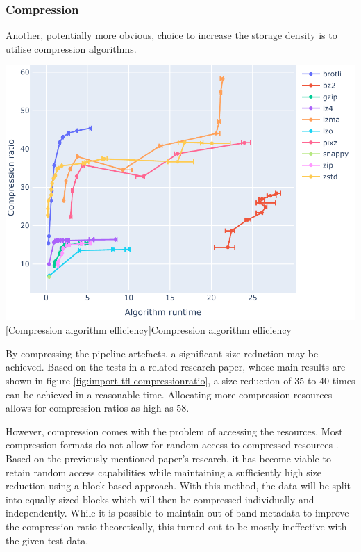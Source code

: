         \subsubsection{Compression}
            Another, potentially more obvious, choice to increase the storage density is to utilise compression algorithms.
            
            \begin{Figure}
                \includegraphics[width=\linewidth]{image/imported/lineplot-runtime-compressionratio}
                [Compression algorithm efficiency]{Compression algorithm efficiency \cite{tfl}}
                \label{fig:import-tfl-compressionratio}
            \end{Figure}
            
            By compressing the pipeline artefacts, a significant size reduction may be achieved. Based on the tests in a related research paper, whose main results are shown in figure \ref{fig:import-tfl-compressionratio}, a size reduction of 35 to 40 times can be achieved in a reasonable time. Allocating more compression resources allows for compression ratios as high as 58. \cite{tfl}
            
            However, compression comes with the problem of accessing the resources. Most compression formats do not allow for random access to compressed resources \cite{random-access-compression}. Based on the previously mentioned paper's research, it has become viable to retain random access capabilities while maintaining a sufficiently high size reduction using a block-based approach. With this method, the data will be split into equally sized blocks which will then be compressed individually and independently. While it is possible to maintain out-of-band metadata to improve the compression ratio theoretically, this turned out to be mostly ineffective with the given test data. \cite{tfl}
            
